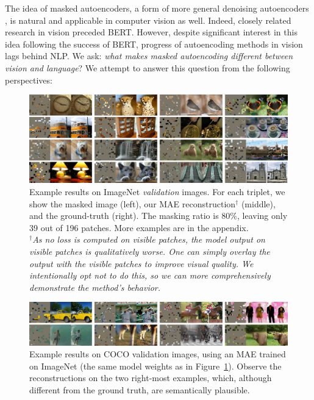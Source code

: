 \documentclass[10pt,twocolumn,letterpaper]{article}
\begin{document}
The idea of masked autoencoders, a form of more general denoising autoencoders \cite{Vincent2008}, is natural and applicable in computer vision as well. Indeed, closely related research in vision \cite{Vincent2010,Pathak2016} preceded BERT. However, despite significant interest in this idea following the success of BERT, progress of autoencoding methods in vision lags behind NLP. We ask: \textit{what makes masked autoencoding different between vision and language}? We attempt to answer this question from the following perspectives:

\begin{figure}[t]\centering\vspace{-.5em}
\includegraphics[width=0.98\linewidth]{fig/samples}\vspace{-.5em}
\caption{Example results on ImageNet \emph{validation} images. For each triplet, we show the masked image (left), our MAE reconstruction$^\dagger$ (middle), and the ground-truth (right). The masking ratio is {80\%}, leaving only 39 out of 196 patches. More examples are in the appendix.\\ \textit{\footnotesize $^\dagger$As no loss is computed on visible patches, the model output on visible patches is qualitatively worse. One can simply overlay the output with the visible patches to improve visual quality. We intentionally opt not to do this, so we can more comprehensively demonstrate the method's behavior.}}
\label{fig:samples}\vspace{-.5em}
\end{figure}

\begin{figure}[t]\centering
\includegraphics[width=0.98\linewidth]{fig/samples_coco}\vspace{-.5em}
\caption{Example results on COCO validation images, using an MAE trained on ImageNet (the same model weights as in Figure~\ref{fig:samples}). Observe the reconstructions on the two right-most examples, which, although different from the ground truth, are semantically plausible.}
\label{fig:samples_coco}\vspace{-2mm}
\end{figure}
\end{document}
